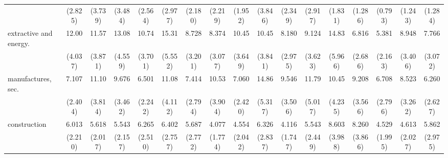 {\begin{tabular}{l*{16}{c}}
                    &     (2.825)         &     (3.739)         &     (3.484)         &     (2.564)         &     (2.977)         &     (2.180)         &     (2.219)         &     (1.952)         &     (3.846)         &     (2.349)         &     (2.917)         &     (1.831)         &     (1.286)         &     (0.793)         &     (1.243)         &     (1.284)         \\
[1em]
extractive and energy.&       12.00\sym{***}&       11.57\sym{***}&       13.08\sym{***}&       10.74\sym{***}&       15.31\sym{***}&       8.728\sym{***}&       8.374\sym{***}&       10.45\sym{***}&       10.45\sym{***}&       8.180\sym{***}&       9.124\sym{***}&       14.83\sym{***}&       6.816\sym{***}&       5.381\sym{***}&       8.948\sym{***}&       7.766\sym{***}\\
                    &     (4.037)         &     (3.871)         &     (4.559)         &     (3.701)         &     (5.552)         &     (3.201)         &     (3.077)         &     (3.649)         &     (3.841)         &     (2.975)         &     (3.623)         &     (5.966)         &     (2.686)         &     (2.163)         &     (3.406)         &     (3.072)         \\
[1em]
manufactures, sec.  &       7.107\sym{***}&       11.10\sym{***}&       9.676\sym{***}&       6.501\sym{***}&       11.08\sym{***}&       7.414\sym{***}&       10.53\sym{***}&       7.060\sym{***}&       14.86\sym{***}&       9.546\sym{***}&       11.79\sym{***}&       10.45\sym{***}&       9.208\sym{***}&       6.708\sym{***}&       8.523\sym{***}&       6.260\sym{***}\\
                    &     (2.404)         &     (3.814)         &     (3.462)         &     (2.242)         &     (4.112)         &     (2.794)         &     (3.904)         &     (2.420)         &     (5.317)         &     (3.506)         &     (5.017)         &     (4.235)         &     (3.566)         &     (2.796)         &     (3.262)         &     (2.627)         \\
[1em]
construction        &       6.013\sym{***}&       5.618\sym{***}&       5.543\sym{***}&       6.265\sym{***}&       6.402\sym{***}&       5.687\sym{***}&       4.077\sym{**} &       4.554\sym{***}&       6.326\sym{***}&       4.116\sym{***}&       5.543\sym{***}&       8.603\sym{***}&       8.260\sym{***}&       4.529\sym{***}&       4.613\sym{***}&       5.862\sym{***}\\
                    &     (2.210)         &     (2.017)         &     (2.157)         &     (2.510)         &     (2.757)         &     (2.772)         &     (1.774)         &     (2.042)         &     (2.837)         &     (1.747)         &     (2.449)         &     (3.988)         &     (3.866)         &     (1.995)         &     (2.027)         &     (2.975)         \\

\end{tabular}}
